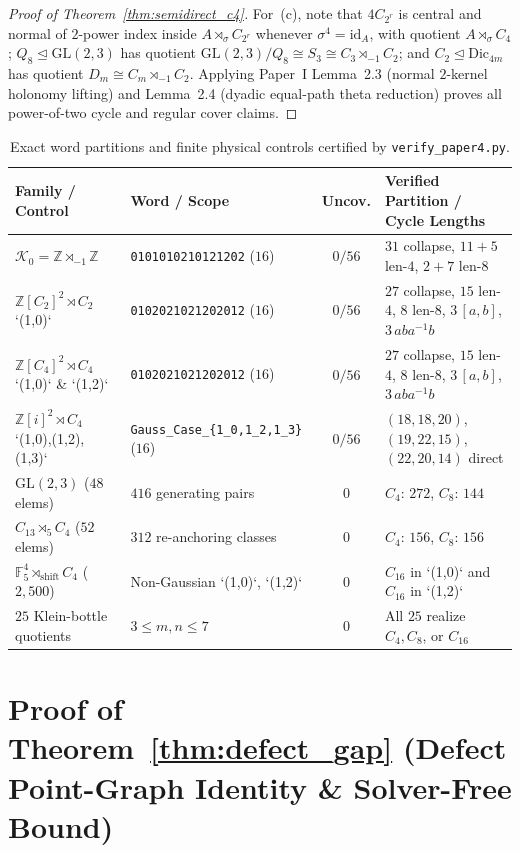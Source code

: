 \documentclass[11pt]{amsart}
\theoremstyle{definition}
\theoremstyle{remark}
\newcommand{\F}{\mathbb{F}}
\newcommand{\Z}{\mathbb{Z}}
\newcommand{\id}{\mathrm{id}}
\begin{document}
\begin{proof}[Proof of Theorem~\ref{thm:semidirect_c4}]
For~(c), note that $4C_{2^r}$ is central and normal of $2$-power index inside $A \rtimes_\sigma C_{2^r}$ whenever $\sigma^4 = \id_A$, with quotient $A \rtimes_\sigma C_4$; $Q_8 \trianglelefteq \mathrm{GL}(2,3)$ has quotient $\mathrm{GL}(2,3)/Q_8 \cong S_3 \cong C_3 \rtimes_{-1} C_2$; and $C_2 \trianglelefteq \mathrm{Dic}_{4m}$ has quotient $D_m \cong C_m \rtimes_{-1} C_2$. Applying Paper~I Lemma~2.3 (normal $2$-kernel holonomy lifting) and Lemma~2.4 (dyadic equal-path theta reduction) proves all power-of-two cycle and regular cover claims.
\end{proof}

\begin{table}[htbp]
\centering
\caption{Exact word partitions and finite physical controls certified by \texttt{verify\_paper4.py}.}\label{tab:c2c4_controls}
\small
\begin{tabular}{llcl}
\toprule
Family / Control & Word / Scope & Uncov. & Verified Partition / Cycle Lengths \\
\midrule
$\mathcal{K}_0 = \Z \rtimes_{-1} \Z$ & \texttt{0101010210121202} ($16$) & $0/56$ & $31$ collapse, $11+5$ len-$4$, $2+7$ len-$8$ \\
$\Z[C_2]^2 \rtimes C_2$ `(1,0)` & \texttt{0102021021202012} ($16$) & $0/56$ & $27$ collapse, $15$ len-$4$, $8$ len-$8$, $3\,[a,b]$, $3\,aba^{-1}b$ \\
$\Z[C_4]^2 \rtimes C_4$ `(1,0)` \& `(1,2)` & \texttt{0102021021202012} ($16$) & $0/56$ & $27$ collapse, $15$ len-$4$, $8$ len-$8$, $3\,[a,b]$, $3\,aba^{-1}b$ \\
$\Z[i]^2 \rtimes C_4$ `(1,0),(1,2),(1,3)` & \texttt{Gauss\_Case\_\{1\_0,1\_2,1\_3\}} ($16$) & $0/56$ & $(18,18,20)$, $(19,22,15)$, $(22,20,14)$ direct \\
$\mathrm{GL}(2,3)$ ($48$ elems) & $416$ generating pairs & $0$ & $C_4$: $272$, $C_8$: $144$ \\
$C_{13} \rtimes_5 C_4$ ($52$ elems) & $312$ re-anchoring classes & $0$ & $C_4$: $156$, $C_8$: $156$ \\
$\F_5^4 \rtimes_{\mathrm{shift}} C_4$ ($2{,}500$) & Non-Gaussian `(1,0)`, `(1,2)` & $0$ & $C_{16}$ in `(1,0)` and $C_{16}$ in `(1,2)` \\
$25$ Klein-bottle quotients & $3 \le m, n \le 7$ & $0$ & All $25$ realize $C_4, C_8$, or $C_{16}$ \\
\bottomrule
\end{tabular}
\end{table}

\section{Proof of Theorem~\ref{thm:defect_gap} (Defect Point-Graph Identity \& Solver-Free Bound)}
\end{document}
